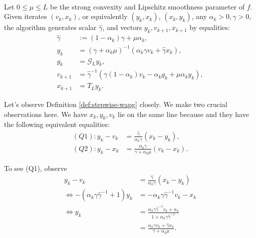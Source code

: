 \documentclass[12pt]{article}
\begin{document}
    \begin{definition}\label{def:stepwise-wapg}\;\\
        Let $0 \le \mu \le L$ be the strong convexity and Lipschitz smoothness parameter of $f$. 
        Given iterates $(v_k, x_k)$, or equivalently $(y_k, x_k)$, $(x_k, y_k)$, any $\alpha_k > 0, \gamma > 0$, the algorithm generates scalar $\hat \gamma$, and vectors $y_k, v_{k + 1}, x_{k + 1}$ by equalities: 
        \begin{align*}
            \hat \gamma &:= (1 - \alpha_k)\gamma + \mu \alpha_k, 
            \\
            y_k &= 
            (\gamma + \alpha_k \mu)^{-1}(\alpha_k \gamma v_k + \hat\gamma x_k), 
            \\
            g_k &= \mathcal G_L y_k, 
            \\
            v_{k + 1} &= \hat\gamma^{-1}
            (\gamma(1 - \alpha_k) v_k - \alpha_k g_k + \mu \alpha_k y_k), 
            \\
            x_{k + 1} &= T_L y_k. 
        \end{align*}
    \end{definition}
    \begin{observation}\label{obs:stepwise-wapg}
        Let's observe Definition \ref{def:stepwise-wapg} closely. 
        We make two crucial observations here. 
        We have $x_k, y_k, v_k$ lie on the same line because and they have the following equivalent equalities: 
        \begin{align*}
            (Q1): 
            y_k - v_k &= 
            \frac{\hat \gamma}{\alpha_k \gamma}(x_k - y_k),
            \\
            (Q2): 
            y_k - x_k &= 
            \frac{\alpha_k \gamma}{\gamma + \alpha_k \mu}(v_k - x_k). 
        \end{align*}
    \end{observation}
        To see (Q1), observe 
        \begin{align*}
            y_k - v_k &= 
            \frac{\hat \gamma}{\alpha_k \gamma}(x_k - y_k)
            \\
            \iff 
            -(\alpha_k \gamma\hat \gamma^{-1} + 1)y_k
            &= 
            - \alpha_k \gamma \hat \gamma^{-1}v_k - x_k
            \\
            \iff 
            y_k &= 
            \frac{
                \alpha_k \gamma \hat \gamma^{-1}v_k + x_k
            }{1 + \alpha_k \gamma \hat \gamma^{-1}}
            \\
            &=  
            \frac{\alpha_k \gamma v_k + \hat \gamma x_k}{\gamma + \alpha_k \mu}.
        \end{align*}
\end{document}
